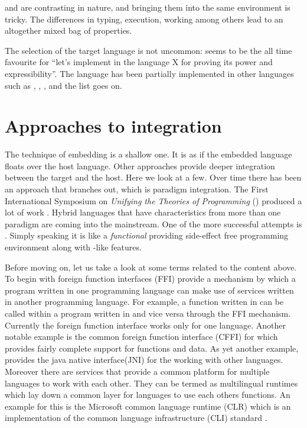 \documentclass[thesis-solanki.tex]{subfiles}
\begin{document}
 and  are contrasting in nature, and bringing them into the same environment is
tricky.
The differences in typing, execution, working among others lead to an altogether mixed bag of properties.


The selection of the target language is not uncommon:  seems to be the all time favourite for
``let's implement  in the language X for proving its power and expressibility''.
The  language has been partially implemented \cite{swipembedd} in other languages such as
 \cite{racklog}, 
\cite{komorowski1982qlog,robinson1982loglisp,robinson1980loglisp},  \cite{wikiprolog, jlog},
 \cite{jscriptlog} and the list \cite{yieldprolog} goes on.

\section{Approaches to integration}

The technique of embedding is a shallow one.
It is as if the embedded language floats over the host language.
Other approaches provide deeper integration between the target and the host.
Here we look at a few.
Over time there has been an approach that branches out, which is paradigm integration.
The First International Symposium on \textit{Unifying the Theories of Programming}
    \textup{(\cite{DBLP:conf/utp/2006})}
    produced a lot of work
    \textup{\cite{DBLP:conf/utp/2008,DBLP:conf/utp/2010,DBLP:conf/utp/2012,hoare1998unifying,
      gibbons2013unifying}}.
Hybrid languages that have characteristics from more than one paradigm are coming into the mainstream.
One of the more successful attempts is  \cite{website:scala}.
Simply speaking it is like a \textit{functional}  providing side-effect free programming environment
along with -like features.

Before moving on, let us take a look at some terms related to the content above.
To begin with foreign function interfaces (FFI) \cite{website:ffiwiki} provide a mechanism by which a program
written in one programming language can make use of services written in another programming language.
For example, a function
written in  can be called within a program written in  and vice versa through the FFI
mechanism.
Currently the  foreign function interface works only for one language.
Another notable example is the common foreign function interface (CFFI) \cite{website:commonlisp} for
 which provides fairly complete support for  functions and data.
As yet another example,  provides the java native interface(JNI) for the working with other
languages.
Moreover there are services that provide a common platform for multiple languages to work with each other.
They can be termed as multilingual runtimes
which lay down a common layer for languages to use each others functions.
An example for this is the Microsoft common language runtime (CLR) \cite{website:clrwiki} which is an
implementation of the common language infrastructure (CLI) standard \cite{website:cliwiki}.
\end{document}
